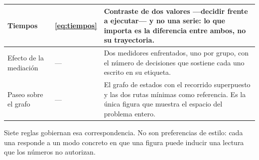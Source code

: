 \documentclass{book}
\begin{document}
\begin{table}[H]
\begin{tabular}{|p{3.5cm}|p{2.2cm}|p{8.6cm}|}
\hline
Tiempos & \ref{eq:tiempos} & Contraste de dos valores —decidir frente a ejecutar— y no una serie: lo que importa es la diferencia entre ambos, no su trayectoria. \\
\hline
Efecto de la mediación & --- & Dos medidores enfrentados, uno por grupo, con el número de decisiones que sostiene cada uno escrito en su etiqueta. \\
\hline
Paseo sobre el grafo & --- & El grafo de estados con el recorrido superpuesto y las dos rutas mínimas como referencia. Es la única figura que muestra el espacio del problema entero. \\
\hline
\end{tabular}
\end{table}

Siete reglas gobiernan esa correspondencia. No son preferencias de
estilo: cada una responde a un modo concreto en que una figura puede
inducir una lectura que los números no autorizan.
\end{document}
